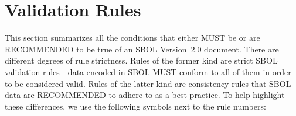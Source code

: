 \newcommand{\printValid}{\validRule{sbol-\arabic{sbolCtr}\addtocounter{sbolCtr}{1}}}
\newcommand{\printComplete}{\completeRule{sbol-\arabic{sbolCtr}\addtocounter{sbolCtr}{1}}}
\newcommand{\printWarning}{\consistencyRule{sbol-\arabic{sbolCtr}\addtocounter{sbolCtr}{1}}}
\newcommand{\printModeling}{\modelingRule{sbol-\arabic{sbolCtr}\addtocounter{sbolCtr}{1}}}

\section{Validation Rules}
\label{validation}

This section summarizes all the conditions that either MUST be or 
are RECOMMENDED to be true of an SBOL Version~2.0 document. There are different degrees of rule strictness.  
Rules of the former kind are strict SBOL validation rules---data encoded in SBOL MUST conform to
all of them in order to be considered valid. Rules of the latter kind
are consistency rules that SBOL data are RECOMMENDED to adhere to as a best practice.  To help highlight these differences, we use the
following symbols next to the rule numbers:

